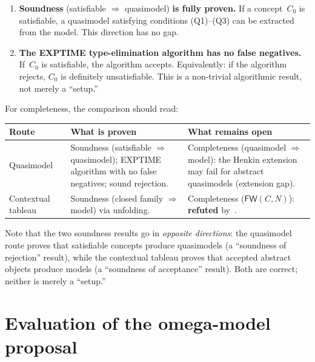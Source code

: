 \documentclass[11pt]{article}
\newcommand{\FW}{\mathsf{FW}}
\begin{document}
\begin{enumerate}
\item \textbf{Soundness} (satisfiable $\Rightarrow$ quasimodel)
  \textbf{is fully proven.}\;  If a concept~$C_0$ is satisfiable,
  a quasimodel satisfying conditions (Q1)--(Q3) can be extracted
  from the model.  This direction has no gap.

\item \textbf{The EXPTIME type-elimination algorithm has no false
  negatives.}\;  If~$C_0$ is satisfiable, the algorithm accepts.
  Equivalently: if the algorithm rejects, $C_0$ is definitely
  unsatisfiable.  This is a non-trivial algorithmic result, not
  merely a ``setup.''
\end{enumerate}

For completeness, the comparison should read:

\begin{center}
\renewcommand{\arraystretch}{1.25}
\begin{tabularx}{\textwidth}{@{}>{\raggedright\arraybackslash}p{}
  >{\raggedright\arraybackslash}p{}
  >{\raggedright\arraybackslash}X@{}}
\toprule
\textbf{Route} & \textbf{What is proven} &
  \textbf{What remains open} \\
\midrule
Quasimodel~\cite{Claude2026Quasi}
  & Soundness (satisfiable $\Rightarrow$ quasimodel);
    EXPTIME algorithm with no false negatives;
    sound rejection.
  & Completeness (quasimodel $\Rightarrow$ model):
    the Henkin extension may fail for abstract quasimodels
    (extension gap). \\
\addlinespace
Contextual tableau~\cite{GPT2026Tableau}
  & Soundness (closed family $\Rightarrow$ model)
    via unfolding.
  & Completeness ($\FW(C,N)$): \textbf{refuted}
    by~\cite{Claude2026FW}. \\
\bottomrule
\end{tabularx}
\end{center}

Note that the two soundness results go in \emph{opposite
directions}: the quasimodel route proves that satisfiable concepts
produce quasimodels (a ``soundness of rejection'' result), while the
contextual tableau proves that accepted abstract objects produce
models (a ``soundness of acceptance'' result).  Both are correct;
neither is merely a ``setup.''

\section{Evaluation of the omega-model proposal}
\end{document}
